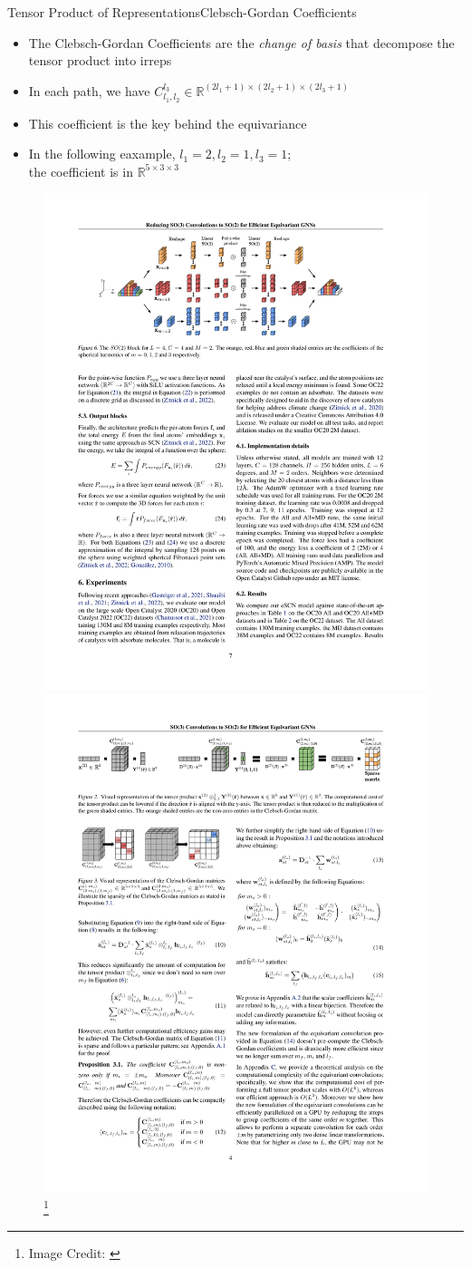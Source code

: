 \documentclass[pdf,serif]{beamer}
\newcommand{\empr}[1]{{\color{BerkeleyBlue}\emph{#1}}}
\begin{document}
\begin{frame}{Tensor Product of Representations}{Clebsch-Gordan Coefficients}
    \begin{itemize}
        \item The {Clebsch-Gordan Coefficients} are the \empr{change of basis} that decompose the tensor product into irreps
        \item In each path, we have $C^{l_3}_{l_1, l_2}\in \mathbb{R}^{(2l_1+1)\times (2l_2+1) \times (2l_3+1)}$
        \item This coefficient is the key behind the equivariance 
        \item In the following eaxample, $l_1=2, l_2=1, l_3=1$;\\ the coefficient is in $\mathbb R^{5\times 3\times 3}$
    \end{itemize}
    \begin{figure}
        \includegraphics[width=0.4\linewidth]{images/tensor.pdf}
        \hfill
        \includegraphics[width=0.4\linewidth]{images/cg.pdf}\footnote[frame]{Image Credit: \citet{Passaro2023ReducingSC}}
    \end{figure}
\end{frame}
\end{document}
